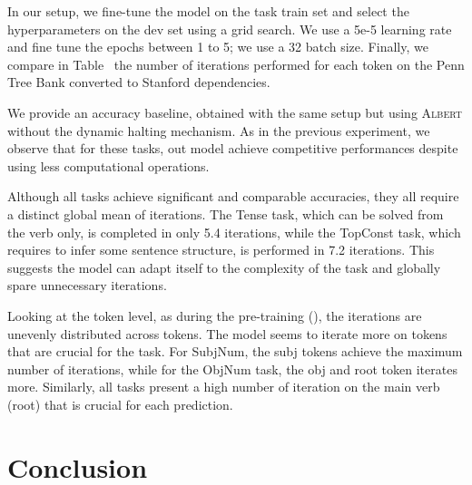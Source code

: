 In our setup, we fine-tune the model on the task train set and select the hyperparameters on the dev set using a grid search. We use a 5e-5 learning rate and fine tune the epochs between 1 to 5; we use a 32 batch size.
Finally, we %
compare in Table~ the number of iterations performed for each token 
on the Penn Tree Bank \parencite{marcus_94} converted to Stanford dependencies.

We provide an accuracy baseline, obtained with the same setup but using \textsc{Albert}  without the dynamic halting mechanism. As in the previous experiment, we observe that for these tasks, out model achieve competitive performances despite using less computational operations.

Although all tasks achieve significant and comparable accuracies, they all require a distinct global mean of iterations. The Tense task, which can be solved from the verb only, is completed in only 5.4 iterations, while the TopConst task, which requires to infer some sentence structure, is performed in 7.2 iterations. This suggests the model can adapt itself to the complexity of the task and globally spare unnecessary iterations. 

Looking at the token level, as during the pre-training (), the iterations are unevenly distributed across tokens. The model seems to iterate more on tokens that are crucial for the task. For SubjNum, the subj tokens achieve the maximum number of iterations, while for the ObjNum task, the obj and root token iterates more. Similarly, all tasks present a high number of iteration on the main verb (root) that is crucial for each prediction.

\section{Conclusion}

